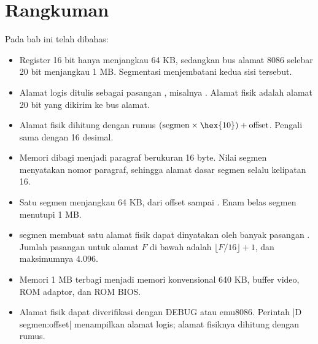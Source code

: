 \section{Rangkuman}
\label{sec:rangkuman-bab6}

Pada bab ini telah dibahas:

\begin{itemize}
    \item Register 16 bit hanya menjangkau 64 KB, sedangkan bus
          alamat 8086 selebar 20 bit menjangkau 1 MB. Segmentasi
          menjembatani kedua sisi tersebut.

    \item Alamat logis ditulis sebagai pasangan
          , misalnya .
          Alamat fisik adalah alamat 20 bit yang dikirim ke bus
          alamat.

    \item Alamat fisik dihitung dengan rumus
          $(\text{segmen} \times \hex{10}) + \text{offset}$.
          Pengali  sama dengan 16 desimal.

    \item Memori dibagi menjadi paragraf berukuran 16 byte. Nilai
          segmen menyatakan nomor paragraf, sehingga alamat dasar
          segmen selalu kelipatan 16.

    \item Satu segmen menjangkau 64 KB, dari offset 
          sampai . Enam belas segmen menutupi 1 MB.

    \item {} segmen membuat satu alamat fisik dapat
          dinyatakan oleh banyak pasangan .
          Jumlah pasangan untuk alamat $F$ di bawah 
          adalah $\lfloor F/16 \rfloor + 1$, dan maksimumnya 4.096.

    \item Memori 1 MB terbagi menjadi memori konvensional 640 KB,
          buffer video, ROM adaptor, dan ROM BIOS.

    \item Alamat fisik dapat diverifikasi dengan DEBUG atau
          emu8086. Perintah \lstasm|D segmen:offset| menampilkan
          alamat logis; alamat fisiknya dihitung dengan rumus.
\end{itemize}

